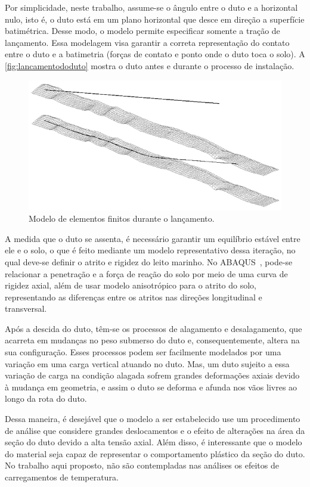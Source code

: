 Por simplicidade, neste trabalho, assume-se o ângulo entre o duto e a horizontal nulo, isto é, o duto está em um plano horizontal que desce em direção a superfície batimétrica.
Desse modo, o modelo permite especificar somente a tração de lançamento.
Essa modelagem visa garantir a correta representação do contato entre o duto e a batimetria (forças de contato e ponto onde o duto toca o solo).
A \autoref{fig:lancamentododuto} mostra o duto antes e durante o processo de instalação.

\begin{figure}[!ht]
    \centering
    \caption{Modelo de elementos finitos durante o lançamento.}\label{fig:lancamentododuto}
    \includegraphics[width=0.7\linewidth]{imagens/lancamento_do_duto}
\end{figure}

A medida que o duto se assenta, é necessário garantir um equilíbrio estável entre ele e o solo, o que é feito mediante um modelo representativo dessa iteração, no qual deve-se definir o atrito e rigidez do leito marinho.
No ABAQUS~\cite{Dassault2018}, pode-se relacionar a penetração e a força de reação do solo por meio de uma curva de rigidez axial, além de usar modelo anisotrópico para o atrito do solo, representando as diferenças entre os atritos nas direções longitudinal e transversal.

Após a descida do duto, têm-se os processos de alagamento e desalagamento, que acarreta em mudanças no peso submerso do duto e, consequentemente, altera na sua configuração.
Esses processos podem ser facilmente modelados por uma variação em uma carga vertical atuando no duto.
Mas, um duto sujeito a essa variação de carga na condição alagada sofrem grandes deformações axiais devido à mudança em geometria, e assim o duto se deforma e afunda nos vãos livres ao longo da rota do duto.

Dessa maneira, é desejável que o modelo a ser estabelecido use um procedimento de análise que considere grandes deslocamentos e o efeito de alterações na área da seção do duto devido a alta tensão axial.
Além disso, é interessante que o modelo do material seja capaz de representar o comportamento plástico da seção do duto. No trabalho aqui proposto, não são contempladas nas análises os efeitos de carregamentos de temperatura.


